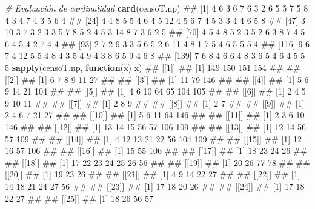 \documentclass[11pt,]{article}
\newenvironment{Shaded}{\begin{snugshade}}{\end{snugshade}}
\newcommand{\KeywordTok}[1]{\textcolor[rgb]{0.13,0.29,0.53}{\textbf{#1}}}
\newcommand{\CommentTok}[1]{\textcolor[rgb]{0.56,0.35,0.01}{\textit{#1}}}
\newcommand{\ControlFlowTok}[1]{\textcolor[rgb]{0.13,0.29,0.53}{\textbf{#1}}}
\newcommand{\NormalTok}[1]{#1}
\begin{document}
\begin{Shaded}
\begin{Highlighting}[]
\CommentTok{# Evaluación de cardinalidad}
\KeywordTok{card}\NormalTok{(censoT.np)   }
\NormalTok{##   [1]  4  6  3  6  7  6  3  2  6  5  5  7  5  8  4  3  4  7  4  3  5  6  4}
\NormalTok{##  [24]  4  4  8  5  5  4  6  4  5 12  4  5  6  7  4  5  3  3  4  4  6  5  8}
\NormalTok{##  [47]  3 10  3  7  3  2  3  3  5  7  8  5  2  4  5  3 14  8  7  3  6  2  5}
\NormalTok{##  [70]  4  5  4  8  5  2  3  5  2  6  3  8  7  4  5  6  4  5  4  2  7  4  4}
\NormalTok{##  [93]  2  7  2  9  3  3  5  6  5  2  6 11  4  8  1  7  5  4  6  5  5  5  4}
\NormalTok{## [116]  9  6  7  4 12  5  5  4  8  4  3  5  4  9  4  3  8  6  5  9  4  6  8}
\NormalTok{## [139]  7  6  8  4  6  6  4  8  3  6  5  4  6  4  5  5  5}
\KeywordTok{sapply}\NormalTok{(censoT.np, }\ControlFlowTok{function}\NormalTok{(x) x)}
\NormalTok{## [[1]]}
\NormalTok{## [1] 149 150 151 154}
\NormalTok{## }
\NormalTok{## [[2]]}
\NormalTok{## [1]  6  7  8  9 11 27}
\NormalTok{## }
\NormalTok{## [[3]]}
\NormalTok{## [1]  11  79 146}
\NormalTok{## }
\NormalTok{## [[4]]}
\NormalTok{## [1]   5   6   9  14  21 104}
\NormalTok{## }
\NormalTok{## [[5]]}
\NormalTok{## [1]   4   6  10  64  65 104 105}
\NormalTok{## }
\NormalTok{## [[6]]}
\NormalTok{## [1]  2  4  5  9 10 11}
\NormalTok{## }
\NormalTok{## [[7]]}
\NormalTok{## [1] 2 8 9}
\NormalTok{## }
\NormalTok{## [[8]]}
\NormalTok{## [1] 2 7}
\NormalTok{## }
\NormalTok{## [[9]]}
\NormalTok{## [1]  2  4  6  7 21 27}
\NormalTok{## }
\NormalTok{## [[10]]}
\NormalTok{## [1]   5   6  11  64 146}
\NormalTok{## }
\NormalTok{## [[11]]}
\NormalTok{## [1]   2   3   6  10 146}
\NormalTok{## }
\NormalTok{## [[12]]}
\NormalTok{## [1]  13  14  15  56  57 106 109}
\NormalTok{## }
\NormalTok{## [[13]]}
\NormalTok{## [1]  12  14  56  57 109}
\NormalTok{## }
\NormalTok{## [[14]]}
\NormalTok{## [1]   4  12  13  21  22  56 104 109}
\NormalTok{## }
\NormalTok{## [[15]]}
\NormalTok{## [1]  12  16  57 106}
\NormalTok{## }
\NormalTok{## [[16]]}
\NormalTok{## [1]  15  55 106}
\NormalTok{## }
\NormalTok{## [[17]]}
\NormalTok{## [1] 18 23 24 26}
\NormalTok{## }
\NormalTok{## [[18]]}
\NormalTok{## [1] 17 22 23 24 25 26 56}
\NormalTok{## }
\NormalTok{## [[19]]}
\NormalTok{## [1] 20 26 77 78}
\NormalTok{## }
\NormalTok{## [[20]]}
\NormalTok{## [1] 19 23 26}
\NormalTok{## }
\NormalTok{## [[21]]}
\NormalTok{## [1]  4  9 14 22 27}
\NormalTok{## }
\NormalTok{## [[22]]}
\NormalTok{## [1] 14 18 21 24 27 56}
\NormalTok{## }
\NormalTok{## [[23]]}
\NormalTok{## [1] 17 18 20 26}
\NormalTok{## }
\NormalTok{## [[24]]}
\NormalTok{## [1] 17 18 22 27}
\NormalTok{## }
\NormalTok{## [[25]]}
\NormalTok{## [1] 18 26 56 57}

\end{Highlighting}
\end{Shaded}
\end{document}
